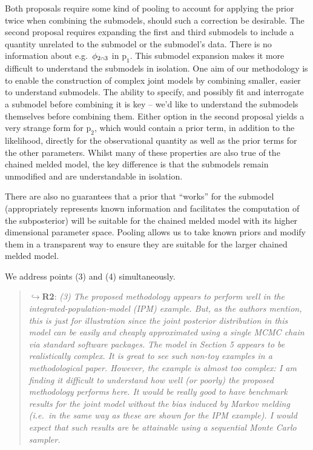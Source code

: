 \documentclass[
  10pt,
  a4paper,
]{article}
\let\Oldcap\cap
\renewcommand{\cap}{\mathrel{\mathsmaller{\Oldcap}}}
\newcommand{\pd}{\text{p}}
\begin{document}
Both proposals require some kind of pooling to account for applying the
prior twice when combining the submodels, should such a correction be
desirable. The second proposal requires expanding the first and third
submodels to include a quantity unrelated to the submodel or the
submodel's data. There is no information about e.g.~\(\phi_{2 \cap 3}\)
in \(\pd_{1}\). This submodel expansion makes it more difficult to
understand the submodels in isolation. One aim of our methodology is to
enable the construction of complex joint models by combining smaller,
easier to understand submodels. The ability to specify, and possibly fit
and interrogate a submodel before combining it is key -- we'd like to
understand the submodels themselves before combining them. Either option
in the second proposal yields a very strange form for \(\pd_{2}\), which
would contain a prior term, in addition to the likelihood, directly for
the observational quantity as well as the prior terms for the other
parameters. Whilst many of these properties are also true of the chained
melded model, the key difference is that the submodels remain unmodified
and are understandable in isolation.

There are also no guarantees that a prior that ``works'' for the
submodel (appropriately represents known information and facilitates the
computation of the subposterior) will be suitable for the chained melded
model with its higher dimensional parameter space. Pooling allows us to
take known priors and modify them in a transparent way to ensure they
are suitable for the larger chained melded model.

\par

\noindent\hrulefill

\par

We address points (3) and (4) simultaneously.

\begin{quote}
\(\hookrightarrow\)\textbf{R2}: \emph{(3) The proposed methodology
appears to perform well in the integrated-population-model (IPM)
example. But, as the authors mention, this is just for illustration
since the joint posterior distribution in this model can be easily and
cheaply approximated using a single MCMC chain via standard software
packages.} \emph{The model in Section 5 appears to be realistically
complex. It is great to see such non-toy examples in a methodological
paper. However, the example is almost too complex: I am finding it
difficult to understand how well (or poorly) the proposed methodology
performs here. It would be really good to have benchmark results for the
joint model without the bias induced by Markov melding (i.e.~in the same
way as these are shown for the IPM example). I would expect that such
results are be attainable using a sequential Monte Carlo sampler.}
\end{quote}
\end{document}
